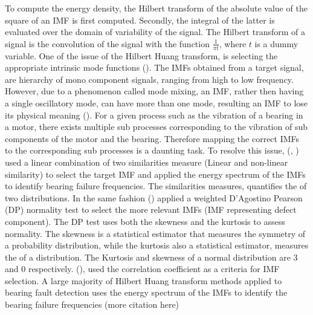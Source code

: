 \documentclass[../Main/thesis.tex]{subfiles}
\begin{document}
To compute the energy density, the Hilbert transform of the absolute value of the square of an IMF is first computed. Secondly, the integral of the latter is evaluated over the domain of variability of the signal. The Hilbert transform of a signal is the convolution of the signal with the function $\frac{1}{\pi t}$, where $t$ is a dummy variable.
\justify
One of the issue of the Hilbert Huang transform, is selecting the appropriate intrinsic mode functions (\cite{fosso2019}). The IMFs obtained from a target signal, are hierarchy of mono component signals, ranging from high to low frequency. However, due to a phenomenon called mode mixing, an IMF, rather then having a single oscillatory mode, can have more than one mode, resulting an IMF to lose its physical meaning (\cite{fosso2019}). For a given process such as the vibration of a bearing in a motor, there exists multiple sub processes corresponding to the vibration of sub components of the motor and the bearing. Therefore mapping the correct IMFs to the corresponding sub processes is a daunting task.
\justify
 To resolve this issue, (\cite{osman2013a}, \cite{osman2013b} ) used a linear combination of two similarities measure (Linear and non-linear similarity) to select the target IMF and applied the energy spectrum of the IMFs to identify bearing failure frequencies. The similarities measures, quantifies the  of two distributions.
In the same fashion (\cite{osman2014}) applied a weighted D'Agostino Pearson (DP) normality test to select the more relevant IMFs (IMF representing defect component). The DP test uses both the skewness and the kurtosis to assess normality.
The skewness is a statistical estimator that measures the symmetry of a probability distribution, while the kurtosis also a statistical estimator, measures the  of a distribution. The Kurtosis and skewness of a normal distribution are 3 and 0 respectively. (\cite{peng2004}), used the correlation coefficient as a criteria for IMF selection.
\justify
A large majority of Hilbert Huang transform methods applied to bearing fault detection uses the energy spectrum of the IMFs to identify the bearing failure frequencies (more citation here)
\justify
 




\end{document}
